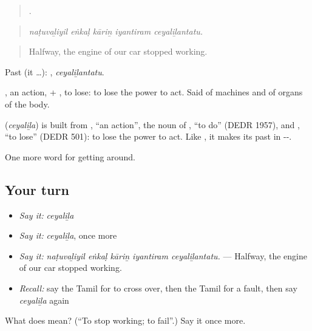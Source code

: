 \begin{quote}
    .
\end{quote}

\begin{quote}
\emph{naṭuvaḻiyil eṅkaḷ kāriṉ iyantiram ceyaliḻantatu.}
\end{quote}

\begin{quote}
Halfway, the engine of our car stopped working.
\end{quote}

Past (it …): , \emph{ceyaliḻantatu}.

, an action, + , to lose: to lose the power to act. Said of machines and of organs of the body.

\begin{cousinweb}
\textbf{} (\emph{ceyaliḻa}) is built from , \textquotedblleft{}an action\textquotedblright{}, the noun of , \textquotedblleft{}to do\textquotedblright{} (DEDR 1957), and , \textquotedblleft{}to lose\textquotedblright{} (DEDR 501): to lose the power to act. Like , it makes its past in --.
\end{cousinweb}

\begin{grammarlens}[title={What you've built}]
One more word for getting around.
\end{grammarlens}

\subsection*{Your turn}
\begin{itemize}
\raggedright
  \item \emph{Say it:} \emph{ceyaliḻa}
  \item \emph{Say it:} \emph{ceyaliḻa}, once more
  \item \emph{Say it:} \emph{naṭuvaḻiyil eṅkaḷ kāriṉ iyantiram ceyaliḻantatu.} — Halfway, the engine of our car stopped working.
  \item \emph{Recall:} say the Tamil for to cross over, then the Tamil for a fault, then say \emph{ceyaliḻa} again
\end{itemize}

\begin{tcolorbox}[breakable,colback=teal!4,colframe=teal!35!black,title={Before you move on}]
What does  mean? (\textquotedblleft{}To stop working; to fail\textquotedblright{}.) Say it once more.
\end{tcolorbox}

